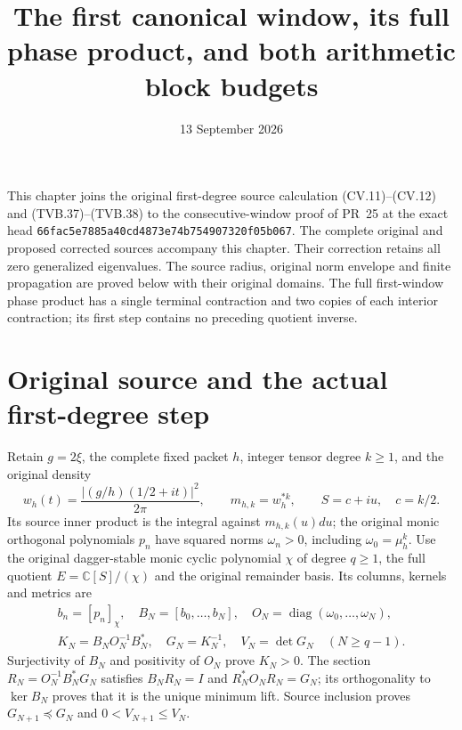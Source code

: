 \documentclass[11pt]{article}
\title{The first canonical window, its full phase product, and both arithmetic block budgets}
\author{}
\date{13 September 2026}
\newcommand{\C}{\mathbb C}
\begin{document}
\maketitle

This chapter joins the original first-degree source calculation
(CV.11)--(CV.12) and (TVB.37)--(TVB.38) to the consecutive-window
proof of PR~25 at the exact head
\texttt{66fac5e7885a40cd4873}\allowbreak\texttt{e74b754907320f05b067}.
The complete original and proposed corrected sources accompany this
chapter. Their correction retains all zero generalized eigenvalues.
The source radius, original norm envelope and finite propagation
are proved below with their original domains. The full first-window
phase product has a single terminal contraction and two copies of
each interior contraction; its first step contains no preceding
quotient inverse.

\section{Original source and the actual first-degree step}

Retain $g=2\xi$, the complete fixed packet $h$, integer tensor degree $k\ge1$,
and the original density
\[
 w_h(t)=\frac{|(g/h)(1/2+it)|^2}{2\pi},\qquad
 m_{h,k}=w_h^{*k},\qquad S=c+iu,\quad c=k/2.
 \tag{CJ.1}
\]
Its source inner product is the integral against $m_{h,k}(u)du$;
the original monic orthogonal polynomials $p_n$ have squared norms
$\omega_n>0$, including $\omega_0=\mu_h^k$.
Use the original dagger-stable monic cyclic polynomial $\chi$ of
degree $q\ge1$, the full quotient $E=\C[S]/(\chi)$ and the
original remainder basis. Its columns, kernels and metrics are
\[
 \begin{gathered}
 b_n=[p_n]_\chi,\quad B_N=[b_0,\ldots,b_N],\quad
 O_N=\operatorname{diag}(\omega_0,\ldots,\omega_N),\quad
 \\
 K_N=B_NO_N^{-1}B_N^*,\quad G_N=K_N^{-1},\quad V_N=\det G_N
 \quad(N\ge q-1).
 \end{gathered}
 \tag{CJ.2}
\]
Surjectivity of $B_N$ and positivity of $O_N$ prove $K_N>0$.
The section $R_N=O_N^{-1}B_N^*G_N$ satisfies $B_NR_N=I$ and
$R_N^*O_NR_N=G_N$; its orthogonality to $\ker B_N$ proves
that it is the unique minimum lift. Source inclusion proves
$G_{N+1}\preceq G_N$ and $0<V_{N+1}\le V_N$.
\end{document}
